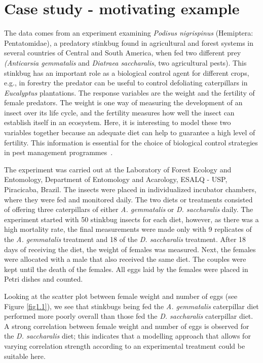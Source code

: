 \documentclass[useAMS,referee]{biom}
\begin{document}
\section{Case study - motivating example}


The data comes from an experiment examining \textit{Podisus nigrispinus} (Hemiptera: Pentatomidae), a predatory stinkbug found in agricultural and forest systems in several countries of Central and South America, when fed two different prey \textit{(Anticarsia gemmatalis} and \textit{Diatraea saccharalis}, two agricultural pests). 
This stinkbug has an important role as a biological control agent
for different crops, e.g., in forestry the predator can be useful to control defoliating caterpillars in \textit{Eucalyptus} plantations. The response variables are the weight and the fertility of female predators. The weight is one way of measuring the development of an insect over its life cycle, and the fertility measures how well the insect can establish itself in an ecosystem. 
Here, it is interesting to model these two variables together because an adequate diet can help to guarantee a high level of fertility. This information is essential for the choice of biological control strategies in pest management programmes~\citep{parra2002controle}. 

The experiment was carried out at the Laboratory of Forest Ecology and Entomology, Department of Entomology and Acarology, ESALQ - USP, Piracicaba, Brazil. The insects were placed in individualized incubator chambers, where they were fed and monitored daily. The two diets or treatments consisted of offering three caterpillars of either \textit{A. gemmatalis} or \textit{D. saccharalis} daily. The experiment started with 50 stinkbug insects for each diet, however, as there was a high mortality rate, the final measurements were made only with 9 replicates of the  \textit{A. gemmatalis} treatment and 18 of the \textit{D. saccharalis} treatment. After 18 days of receiving the diet, the weight of females was measured. Next, the females were allocated with a male that also received the same diet. The couples were kept until the death of the females. All eggs laid by the females were placed in Petri dishes and counted.

Looking at the scatter plot between female weight and number of eggs (see Figure \ref{fig1.1}), we see that stinkbugs being fed the \textit{A. gemmatalis} caterpillar diet performed more poorly overall than those fed the \textit{D. saccharalis} caterpillar diet. A strong correlation between female weight and number of eggs is observed for the \textit{D. saccharalis} diet; this indicates that a modelling approach that allows for varying correlation strength according to an experimental treatment could be suitable here.
\end{document}

